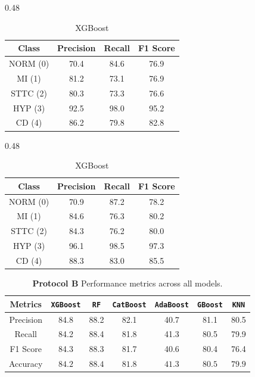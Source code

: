\begin{table}[H]
    \begin{subtable}[t]{0.48\textwidth}
        \centering
        \caption{CatBoost}
        \label{tab:cv_cat_ablation}
        \begin{tabular}{cccc}
            \toprule
            Class & Precision & Recall & F1 Score \\
            \midrule
            NORM (0) & 70.4 & 84.6 & 76.9 \\
            MI   (1) & 81.2 & 73.1 & 76.9 \\
            STTC (2) & 80.3 & 73.3 & 76.6 \\
            HYP  (3) & 92.5 & 98.0 & 95.2 \\
            CD   (4) & 86.2 & 79.8 & 82.8 \\
            \bottomrule
        \end{tabular}
    \end{subtable}
    \hfill
    \begin{subtable}[t]{0.48\textwidth}
        \centering
        \caption{XGBoost}
        \label{tab:cv_xgb_ablation}
        \begin{tabular}{cccc}
            \toprule
            Class & Precision & Recall & F1 Score \\
            \midrule
            NORM (0) & 70.9 & 87.2 & 78.2 \\
            MI   (1) & 84.6 & 76.3 & 80.2 \\
            STTC (2) & 84.3 & 76.2 & 80.0 \\
            HYP  (3) & 96.1 & 98.5 & 97.3 \\
            CD   (4) & 88.3 & 83.0 & 85.5 \\
            \bottomrule
        \end{tabular}
    \end{subtable}
\end{table}



\begin{table}[H]
    \centering
    \caption{\textbf{Protocol B} Performance metrics across all models.}
    \label{tab:single_model_wise_ablation}
    \begin{tabular}{ccccccc}
        \toprule
        Metrics & \texttt{XGBoost} & \texttt{RF} & \texttt{CatBoost} & \texttt{AdaBoost} & \texttt{GBoost} & \texttt{KNN} \\
        \midrule
        Precision & 84.8 & 88.2 & 82.1 & 40.7 & 81.1 & 80.5 \\
        Recall & 84.2 & 88.4 & 81.8 & 41.3 & 80.5 & 79.9 \\
        F1 Score & 84.3 & 88.3 & 81.7 & 40.6 & 80.4 & 76.4 \\
        Accuracy & $84.2$ & $88.4$ & $81.8$ & $41.3$ & $80.5$ & $79.9$ \\
        \bottomrule
    \end{tabular}
\end{table}

